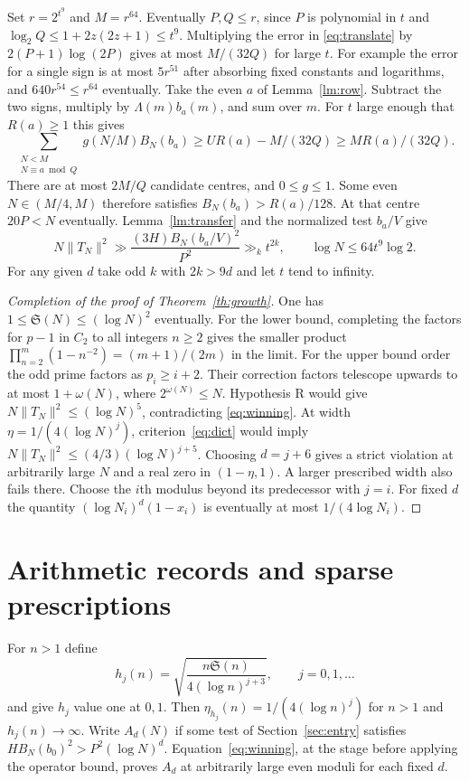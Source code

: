\documentclass[11pt,a4paper]{article}
\newcommand{\SSg}{\mathfrak S}
\begin{document}
Set $r=2^{t^9}$ and $M=r^{64}$. Eventually $P,Q\le r$, since $P$ is polynomial in $t$ and $\log_2 Q\le 1+2z(2z+1)\le t^9$. Multiplying the error in \eqref{eq:translate} by $2(P+1)\log(2P)$ gives at most $M/(32Q)$ for large $t$. For example the error for a single sign is at most $5r^{51}$ after absorbing fixed constants and logarithms, and $640r^{54}\le r^{64}$ eventually. Take the even $a$ of Lemma~\ref{lm:row}. Subtract the two signs, multiply by $\Lambda(m)b_a(m)$, and sum over $m$. For $t$ large enough that $R(a)\ge1$ this gives
\[
 \sum_{\substack{N<M\\N\equiv a\bmod Q}}g(N/M) B_N(b_a)
 \ge U R(a)-M/(32Q)\ge M R(a)/(32Q).
\]
There are at most $2M/Q$ candidate centres, and $0\le g\le1$. Some even $N\in(M/4,M)$ therefore satisfies $B_N(b_a)>R(a)/128$. At that centre $20P<N$ eventually. Lemma~\ref{lm:transfer} and the normalized test $b_a/V$ give
\begin{equation}\label{eq:winning}
  N\|T_N\|^2\gg \frac{(3H)B_N(b_a/V)^2}{P^2}
       \gg_k t^{2k},\qquad \log N\le64t^9\log2 .
\end{equation}
For any given $d$ take odd $k$ with $2k>9d$ and let $t$ tend to infinity.

\begin{proof}[Completion of the proof of Theorem~\ref{th:growth}]
One has $1\le\SSg(N)\le(\log N)^2$ eventually. For the lower bound, completing the factors for $p-1$ in $C_2$ to all integers $n\ge2$ gives the smaller product $\prod_{n=2}^m(1-n^{-2})=(m+1)/(2m)$ in the limit. For the upper bound order the odd prime factors as $p_i\ge i+2$. Their correction factors telescope upwards to at most $1+\omega(N)$, where $2^{\omega(N)}\le N$.
Hypothesis R would give $N\|T_N\|^2\le(\log N)^5$, contradicting \eqref{eq:winning}. At width $\eta=1/(4(\log N)^j)$, criterion~\eqref{eq:dict} would imply $N\|T_N\|^2\le(4/3)(\log N)^{j+5}$. Choosing $d=j+6$ gives a strict violation at arbitrarily large $N$ and a real zero in $(1-\eta,1)$. A larger prescribed width also fails there. Choose the $i$th modulus beyond its predecessor with $j=i$. For fixed $d$ the quantity $(\log N_i)^d(1-x_i)$ is eventually at most $1/(4\log N_i)$.
\end{proof}

\section{Arithmetic records and sparse prescriptions}\label{sec:records}

For $n>1$ define
\[
 h_j(n)=\sqrt{\frac{n\SSg(n)}{4(\log n)^{j+3}}},\qquad j=0,1,\ldots
\]
and give $h_j$ value one at $0,1$. Then $\eta_{h_j}(n)=1/(4(\log n)^j)$ for $n>1$ and $h_j(n)\to\infty$. Write $A_d(N)$ if some test of Section~\ref{sec:entry} satisfies $HB_N(b_0)^2>P^2(\log N)^d$. Equation~\eqref{eq:winning}, at the stage before applying the operator bound, proves $A_d$ at arbitrarily large even moduli for each fixed $d$.
\end{document}
